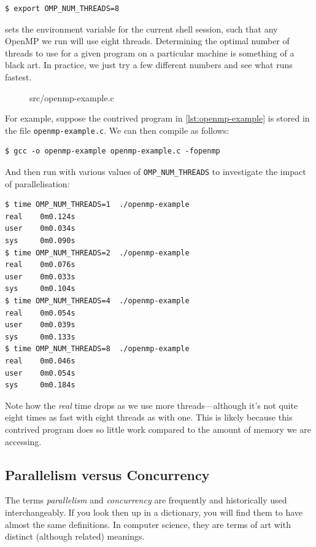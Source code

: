 \begin{verbatim}
$ export OMP_NUM_THREADS=8
\end{verbatim}

sets the environment variable for the current shell session, such that
any OpenMP we run will use eight threads.  Determining the optimal
number of threads to use for a given program on a particular machine
is something of a black art.  In practice, we just try a few different
numbers and see what runs fastest.

\begin{figure}

{src/openmp-example.c}
\end{figure}

For example, suppose the contrived program in
\cref{lst:openmp-example} is stored in the file
\texttt{openmp-example.c}.  We can then compile as follows:

\begin{verbatim}
$ gcc -o openmp-example openmp-example.c -fopenmp
\end{verbatim}

And then run with various values of \lstinline{OMP_NUM_THREADS} to
investigate the impact of parallelisation:

\begin{verbatim}
$ time OMP_NUM_THREADS=1  ./openmp-example
real    0m0.124s
user    0m0.034s
sys     0m0.090s
$ time OMP_NUM_THREADS=2  ./openmp-example
real    0m0.076s
user    0m0.033s
sys     0m0.104s
$ time OMP_NUM_THREADS=4  ./openmp-example
real    0m0.054s
user    0m0.039s
sys     0m0.133s
$ time OMP_NUM_THREADS=8  ./openmp-example
real    0m0.046s
user    0m0.054s
sys     0m0.184s
\end{verbatim}

Note how the \emph{real} time drops as we use more threads---although
it's not quite eight times as fast with eight threads as with one.
This is likely because this contrived program does so little work
compared to the amount of memory we are accessing.

\subsection{Parallelism versus Concurrency}

The terms \emph{parallelism} and \emph{concurrency} are frequently and
historically used interchangeably.  If you look then up in a
dictionary, you will find them to have almost the same definitions.
In computer science, they are terms of art with distinct (although
related) meanings.

